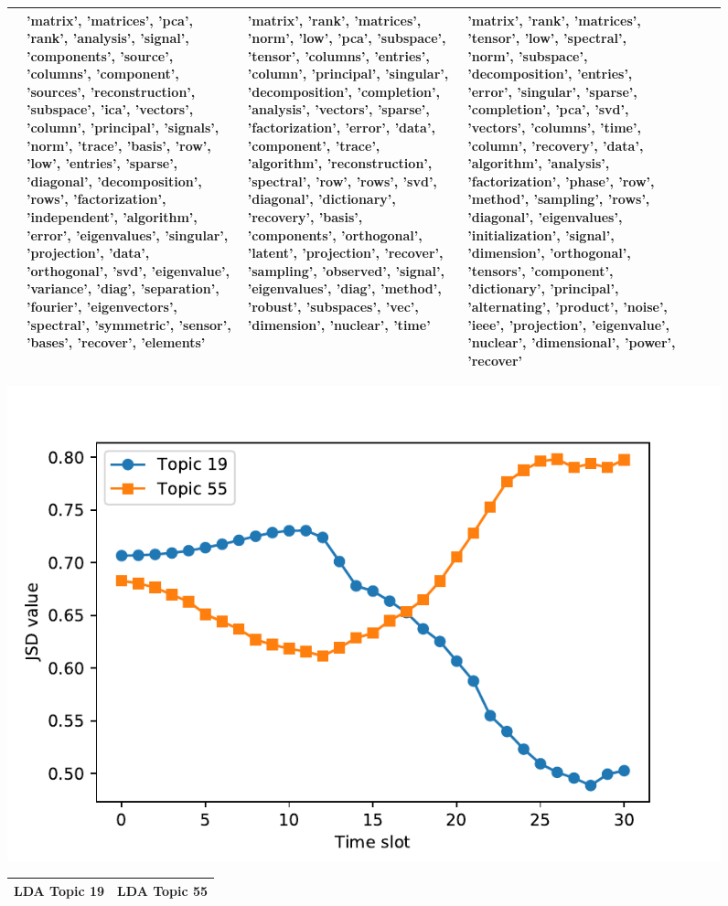 \begin{figure}[t]
\begin{center}
\begin{tabular}{|p{1.8cm}|p{1.8cm}|p{1.8cm}|p{1.8cm}|p{1.8cm}|p{1.8cm}|p{1.8cm}|}
&
'matrix', 'matrices', 'pca', 'rank', 'analysis', 'signal', 'components', 'source', 'columns', 'component', 'sources', 'reconstruction', 'subspace', 'ica', 'vectors', 'column', 'principal', 'signals', 'norm', 'trace', 'basis', 'row', 'low', 'entries', 'sparse', 'diagonal', 'decomposition', 'rows', 'factorization', 'independent', 'algorithm', 'error', 'eigenvalues', 'singular', 'projection', 'data', 'orthogonal', 'svd', 'eigenvalue', 'variance', 'diag', 'separation', 'fourier', 'eigenvectors', 'spectral', 'symmetric', 'sensor', 'bases', 'recover', 'elements'
&
'matrix', 'rank', 'matrices', 'norm', 'low', 'pca', 'subspace', 'tensor', 'columns', 'entries', 'column', 'principal', 'singular', 'decomposition', 'completion', 'analysis', 'vectors', 'sparse', 'factorization', 'error', 'data', 'component', 'trace', 'algorithm', 'reconstruction', 'spectral', 'row', 'rows', 'svd', 'diagonal', 'dictionary', 'recovery', 'basis', 'components', 'orthogonal', 'latent', 'projection', 'recover', 'sampling', 'observed', 'signal', 'eigenvalues', 'diag', 'method', 'robust', 'subspaces', 'vec', 'dimension', 'nuclear', 'time'
&
'matrix', 'rank', 'matrices', 'tensor', 'low', 'spectral', 'norm', 'subspace', 'decomposition', 'entries', 'error', 'singular', 'sparse', 'completion', 'pca', 'svd', 'vectors', 'columns', 'time', 'column', 'recovery', 'data', 'algorithm', 'analysis', 'factorization', 'phase', 'row', 'method', 'sampling', 'rows', 'diagonal', 'eigenvalues', 'initialization', 'signal', 'dimension', 'orthogonal', 'tensors', 'component', 'dictionary', 'principal', 'alternating', 'product', 'noise', 'ieee', 'projection', 'eigenvalue', 'nuclear', 'dimensional', 'power', 'recover'
\\ \hline

\end{tabular}
\includegraphics[scale=0.7]{JSgraph.pdf}
\tiny
\begin{tabular}{|p{7cm}|p{7cm}|}
\hline \bf LDA Topic 19 & \bf LDA Topic 55 \\ \hline


\end{tabular}
\end{center}
\end{figure}
